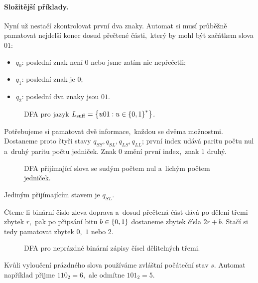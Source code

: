 \paragraph{Složitější příklady.}

\begin{example}\label{ex:dfa-suffix}
    Nyní už nestačí zkontrolovat první dva znaky. Automat si musí průběžně pamatovat nejdelší konec dosud přečtené části,~který by mohl být začátkem slova $01$:
    \begin{itemize}
        \item $q_0$: poslední znak není $0$ nebo jsme zatím nic nepřečetli;
        \item $q_1$: poslední znak je $0$;
        \item $q_2$: poslední dva znaky jsou $01$.
    \end{itemize}
    \begin{figure}[h]
        \centering
        
        \caption{DFA pro jazyk $L_{\mathrm{suff}}=\left\{u01:u\in\left\{0,1\right\}^*\right\}$.}
        \label{fig:dfa-suffix}
    \end{figure}
\end{example}

\begin{example}\label{ex:dfa-parita}
    Potřebujeme si pamatovat dvě informace,~každou se dvěma možnostmi. Dostaneme proto čtyři stavy $q_{SS},q_{SL},q_{LS},q_{LL}$; první index udává paritu počtu nul a~druhý paritu počtu jedniček. Znak $0$ změní první index,~znak $1$ druhý.
    \begin{figure}[h]
        \centering
        
        \caption{DFA přijímající slova se sudým počtem nul a~lichým počtem jedniček.}
        \label{fig:dfa-parita}
    \end{figure}
    Jediným přijímajícím stavem je $q_{SL}$.
\end{example}

\begin{example}\label{ex:dfa-delitelnost}
    Čteme-li binární číslo zleva doprava a~dosud přečtená část dává po dělení třemi zbytek $r$,~pak po připsání bitu $b\in\left\{0,1\right\}$ dostaneme zbytek čísla $2r+b$. Stačí si tedy pamatovat zbytek $0$,~$1$ nebo $2$.
    \begin{figure}[h]
        \centering
        
        \caption{DFA pro neprázdné binární zápisy čísel dělitelných třemi.}
        \label{fig:dfa-delitelnost}
    \end{figure}
    Kvůli vyloučení prázdného slova používáme zvláštní počáteční stav $s$. Automat například přijme $110_2=6$,~ale odmítne $101_2=5$.
\end{example}

